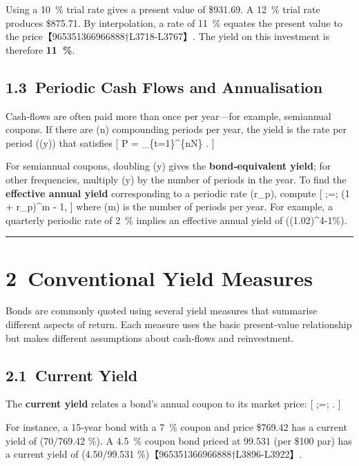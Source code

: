 \documentclass[
  letterpaper,
  DIV=11,
  numbers=noendperiod]{scrartcl}
\begin{document}
Using a 10~\% trial rate gives a present value of \$931.69. A 12~\%
trial rate produces \$875.71. By interpolation, a rate of 11~\% equates
the present value to the price【965351366966888†L3718-L3767】. The yield
on this investment is therefore \textbf{11~\%}.

\subsection{1.3~Periodic Cash Flows and
Annualisation}\label{periodic-cash-flows-and-annualisation}

Cash‑flows are often paid more than once per year---for example,
semiannual coupons. If there are (n) compounding periods per year, the
yield is the rate per period ((y)) that satisfies {[} P =
\sum\_\{t=1\}\^{}\{nN\} . {]}

For semiannual coupons, doubling (y) gives the \textbf{bond‑equivalent
yield}; for other frequencies, multiply (y) by the number of periods in
the year. To find the \textbf{effective annual yield} corresponding to a
periodic rate (r\_p), compute {[}  ;=; (1 +
r\_p)\^{}m - 1, {]} where (m) is the number of periods per year. For
example, a quarterly periodic rate of 2~\% implies an effective annual
yield of ((1.02)\^{}4-1\%).

\begin{center}\rule{0.5\linewidth}{0.5pt}\end{center}

\section{2~Conventional Yield
Measures}\label{conventional-yield-measures}

Bonds are commonly quoted using several yield measures that summarise
different aspects of return. Each measure uses the basic present‑value
relationship but makes different assumptions about cash‑flows and
reinvestment.

\subsection{2.1~Current Yield}\label{current-yield}

The \textbf{current yield} relates a bond's annual coupon to its market
price: {[}  ;=;
. {]}

For instance, a 15‑year bond with a 7~\% coupon and price \$769.42 has a
current yield of (70/769.42 \%). A 4.5~\% coupon bond priced
at 99.531 (per \$100 par) has a current yield of (4.50/99.531
\%)【965351366966888†L3896-L3922】.
\end{document}
